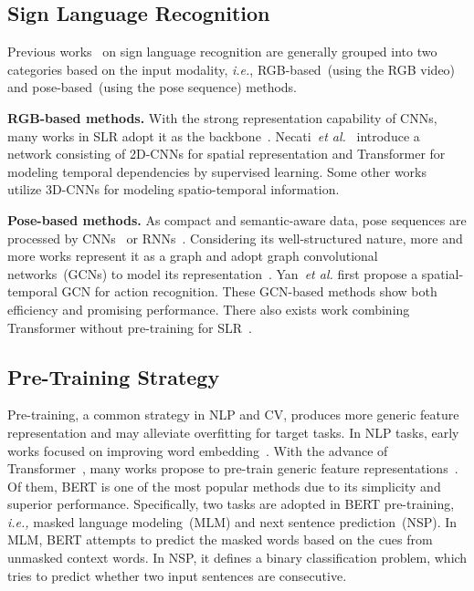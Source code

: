 \documentclass[10pt,twocolumn,letterpaper]{article}
\begin{document}
\subsection{Sign Language Recognition}
Previous works~\cite{koller2020quantitative} on sign language recognition are generally grouped into two categories based on the input modality, \emph{i.e.}, RGB-based~(using the RGB video) and pose-based~(using the pose sequence) methods.

\noindent \textbf{RGB-based methods.} 
With the strong representation capability of CNNs, many works in SLR adopt it as the backbone~\cite{cheng2020fully,koller2018deep,joze2018ms,zhou2021improving}.
Necati~\emph{et al.}~\cite{camgoz2020sign} introduce a network consisting of 2D-CNNs for spatial representation and Transformer for modeling temporal dependencies by supervised learning. 
Some other works~\cite{huang2018attention, joze2018ms, li2020transfer, li2020word, albanie2020bsl} utilize 3D-CNNs for modeling spatio-temporal information.

\noindent \textbf{Pose-based methods.} 
As compact and semantic-aware data, pose sequences are processed by CNNs~\cite{li2018co, cao2018skeleton, albanie2020bsl} or RNNs~\cite{du2015hierarchical,min2020efficient,song2017end}.
Considering its well-structured nature, more and more works represent it as a graph and adopt graph convolutional networks~(GCNs) to model its representation~\cite{du2015hierarchical, song2017end,tunga2020pose}. 
Yan~\emph{et al.} \cite{yan2018spatial} first propose a spatial-temporal GCN for action recognition.
These GCN-based methods show both efficiency and promising performance.
There also exists work combining Transformer without pre-training for SLR~\cite{tunga2020pose}.


\subsection{Pre-Training Strategy}
Pre-training, a common strategy in NLP and CV, produces more generic feature representation and may alleviate overfitting for target tasks.
In NLP tasks, early works focused on improving word embedding~\cite{pennington2014glove,kiros2015skip}.
With the advance of Transformer~\cite{vaswani2017attention}, many works propose to pre-train generic feature representations~\cite{devlin2018bert, radford2018improving, yang2019xlnet}.
Of them, BERT is one of the most popular methods due to its simplicity and superior performance.
Specifically, two tasks are adopted in BERT pre-training, \emph{i.e.,} masked language modeling~(MLM) and next sentence prediction~(NSP).
In MLM, BERT attempts to predict the masked words based on the cues from unmasked context words.
In NSP, it defines a binary classification problem, which tries to predict whether two input sentences are consecutive.
\end{document}
